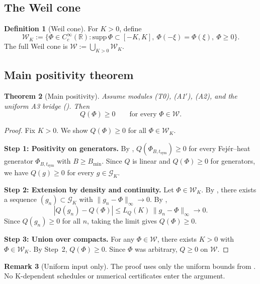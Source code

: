 \documentclass[11pt,a4paper]{article}
\newtheorem{theorem}{Theorem}[section]
\theoremstyle{definition}
\newtheorem{definition}[theorem]{Definition}
\newtheorem{remark}[theorem]{Remark}
\newcommand{\RR}{\mathbb{R}}
\newcommand{\WW}{\mathcal{W}}
\newcommand{\GG}{\mathcal{G}}
\begin{document}
\subsection{The Weil cone}

\begin{definition}[Weil cone]
For $K > 0$, define
\[
\WW_K := \{\Phi \in C^\infty_c(\RR) : \mathrm{supp}\,\Phi \subset [-K,K],\ \Phi(-\xi) = \Phi(\xi),\ \Phi \ge 0\}.
\]
The full Weil cone is $\WW := \bigcup_{K > 0} \WW_K$.
\end{definition}

\subsection{Main positivity theorem}

\begin{theorem}[Main positivity]\label{thm:main-positivity}
Assume modules \textup{(T0)}, \textup{(A1$'$)}, \textup{(A2)}, and the uniform A3 bridge (). Then
\[
Q(\Phi) \ge 0 \qquad \text{for every } \Phi \in \WW.
\]
\end{theorem}

\begin{proof}
Fix $K > 0$. We show $Q(\Phi) \ge 0$ for all $\Phi \in \WW_K$.

\textbf{Step 1: Positivity on generators.} By , $Q(\Phi_{B,t_{\mathrm{sym}}}) \ge 0$ for every Fej\'er--heat generator $\Phi_{B,t_{\mathrm{sym}}}$ with $B \ge B_{\min}$. Since $Q$ is linear and $Q(\Phi) \ge 0$ for generators, we have $Q(g) \ge 0$ for every $g \in \GG_K$.

\textbf{Step 2: Extension by density and continuity.} Let $\Phi \in \WW_K$. By , there exists a sequence $(g_n) \subset \GG_K$ with $\|g_n - \Phi\|_\infty \to 0$. By ,
\[
|Q(g_n) - Q(\Phi)| \le L_Q(K)\,\|g_n - \Phi\|_\infty \to 0.
\]
Since $Q(g_n) \ge 0$ for all $n$, taking the limit gives $Q(\Phi) \ge 0$.

\textbf{Step 3: Union over compacts.} For any $\Phi \in \WW$, there exists $K > 0$ with $\Phi \in \WW_K$. By Step~2, $Q(\Phi) \ge 0$. Since $\Phi$ was arbitrary, $Q \ge 0$ on $\WW$.
\end{proof}

\begin{remark}[Uniform input only]
The proof uses only the uniform bounds from . No K-dependent schedules or numerical certificates enter the argument.
\end{remark}
\end{document}
